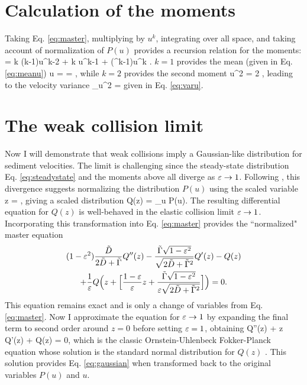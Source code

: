 \section{Calculation of the moments}
\label{sec:langmoments}
Taking Eq. \ref{eq:master}, multiplying by $u^k$, integrating over all space, and taking account of normalization of $P(u)$ provides a recursion relation for the moments: 
 =  k (k-1)\langle u^{k-2} \rangle + \tilde{\Gamma} k \langle u^{k-1} \rangle + (\ve^k-1)\langle u^k \rangle. \ee
$k=1$ provides the mean (given in Eq. \ref{eq:meanu})
\be \langle u \rangle =   = , \ee
while $k=2$ provides the second moment
\be \langle u^2 \rangle = 2 , \ee
leading to the velocity variance
\be \sigma_u^2 = \ee
given in Eq. \ref{eq:varu}.
\section{The weak collision limit}
\label{sec:langextremes}
Now I will demonstrate that weak collisions imply a Gaussian-like distribution for sediment velocities. The limit is challenging since the steady-state distribution Eq. \ref{eq:steadystate} and the moments above all diverge as $\varepsilon \rightarrow 1$.
Following \cite{Hall1989}, this divergence suggests normalizing the distribution $P(u)$ using the scaled variable
\be z = , \ee
giving a scaled distribution
\be Q(z) = \sigma_u P(u).\ee
The resulting differential equation for $Q(z)$ is well-behaved in the elastic collision limit $\varepsilon \rightarrow 1$.
Incorporating this transformation into Eq. \ref{eq:master} provides the ``normalized" master equation
\begin{multline}(1-\varepsilon^2) \frac{\tilde{D}}{2\tilde{D} + \tilde{\Gamma}} Q''(z) - \frac{\tilde{\Gamma}\sqrt{1-\varepsilon^2}}{\sqrt{2\tilde{D}+\tilde{\Gamma}^2}}Q'(z) - Q(z) \\+ \frac{1}{\varepsilon} Q\Big(z + \Big[\frac{1-\varepsilon}{\varepsilon}z + \frac{\tilde{\Gamma}\sqrt{1-\varepsilon^2}}{\varepsilon\sqrt{2\tilde{D}+\tilde{\Gamma}^2}} \Big]\Big) = 0 .\end{multline}
This equation remains exact and is only a change of variables from Eq. \ref{eq:master}.
Now I approximate the equation for $\varepsilon \rightarrow 1$ by expanding the final term to second order around $z=0$ before setting $\varepsilon = 1$, obtaining
\be Q''(z) + z Q'(z) + Q(z) = 0, \ee
which is the classic Ornstein-Uhlenbeck Fokker-Planck equation whose solution is the standard normal distribution for $Q(z)$ \citep[e.g.][]{Gardiner1983}.
This solution provides Eq. \ref{eq:gaussian} when transformed back to the original variables $P(u)$ and $u$.



